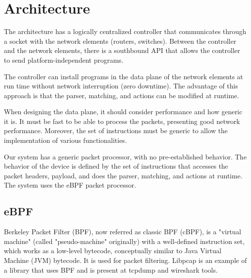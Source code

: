 \section{Architecture}
\label{sec:architecture}


The \system architecture has a logically centralized controller that communicates through a socket with the network elements (\eg routers, switches). 
Between the controller and the network elements, there is a southbound API that allows the controller to send platform-independent programs.

The controller can install programs in the data plane of the network elements at run time without network interruption (zero downtime).
The advantage of this approach is that the parser, matching, and actions can be modified at runtime.


When designing the data plane, it should consider performance and how generic it is. It must be fast to be able to process the packets, presenting good network performance. Moreover,
the set of instructions must be generic to allow the implementation of various functionalities.

Our system has a generic packet processor, with no pre-established behavior.
The behavior of the device is defined by the set of instructions that accesses the packet headers, payload, and does the parser, matching, and actions at runtime.
The system uses the eBPF packet processor.

\subsection{eBPF}

Berkeley Packet Filter (BPF)\cite{McCanne:1993:BPF:1267303.1267305}, now referred as classic BPF (cBPF), is a "virtual machine" (called "pseudo-machine" originally) with a well-defined instruction set, which works as a low-level bytecode, conceptually similar to Java Virtual Machine (JVM) bytecode. It is used for packet filtering. Libpcap is an example of a library that uses BPF and is present at tcpdump and wireshark tools.



